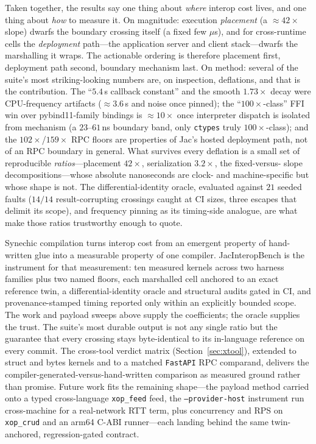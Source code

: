 \documentclass[conference]{IEEEtran}
\newcommand{\code}[1]{\texttt{#1}}
\begin{document}
Taken together, the results say one thing about \emph{where} interop cost lives,
and one thing about \emph{how} to measure it. On magnitude: execution
\emph{placement} (a $\approx$$42\times$ slope) dwarfs the boundary crossing itself
(a fixed few $\mu$s), and for cross-runtime cells the \emph{deployment} path---the
application server and client stack---dwarfs the marshalling it wraps. The
actionable ordering is therefore placement first, deployment path second, boundary
mechanism last. On method: several of the suite's most striking-looking numbers
are, on inspection, deflations, and that is the contribution. The
``$5.4$\,\textmu s callback constant'' and the smooth $1.73\times$ decay were
CPU-frequency artifacts ($\approx$$3.6$\,\textmu s and noise once pinned); the
``$100\times$-class'' FFI win over pybind11-family bindings is $\approx$$10\times$
once interpreter dispatch is isolated from mechanism (a $23$--$61$\,ns boundary
band, only \code{ctypes} truly $100\times$-class); and the $102\times$/$159\times$
RPC floors are properties of Jac's hosted deployment path, not of an RPC boundary
in general. What survives every deflation is a small set of reproducible
\emph{ratios}---placement $42\times$, serialization $3.2\times$, the fixed-versus-%
slope decompositions---whose absolute nanoseconds are clock- and machine-specific
but whose shape is not. The differential-identity oracle, evaluated against $21$
seeded faults ($14/14$ result-corrupting crossings caught at CI sizes, three
escapes that delimit its scope), and frequency pinning as its timing-side
analogue, are what make those ratios trustworthy enough to quote.

Synechic compilation turns interop cost from an emergent property of hand-written
glue into a measurable property of one compiler. JacInteropBench is the
instrument for that measurement: ten measured kernels across two harness
families plus two named floors, each marshalled cell anchored to an exact
reference twin, a differential-identity oracle and structural audits gated in CI,
and provenance-stamped timing reported only within an explicitly bounded scope.
The work and payload sweeps above supply the coefficients; the oracle supplies
the trust. The suite's most durable output is not any single ratio but the
guarantee that every crossing stays byte-identical to its in-language reference on
every commit. The cross-tool verdict matrix (Section~\ref{sec:xtool}), extended
to struct and bytes kernels and to a matched \code{FastAPI} RPC comparand,
delivers the compiler-generated-versus-hand-written comparison as measured
ground rather than promise. Future work fits the
remaining shape---the payload method carried onto a typed cross-language
\code{xop\_feed} feed, the \code{--provider-host} instrument run cross-machine
for a real-network RTT term, plus concurrency and RPS on
\code{xop\_crud} and an arm64 C-ABI runner---each landing behind the same
twin-anchored, regression-gated contract.
\end{document}
